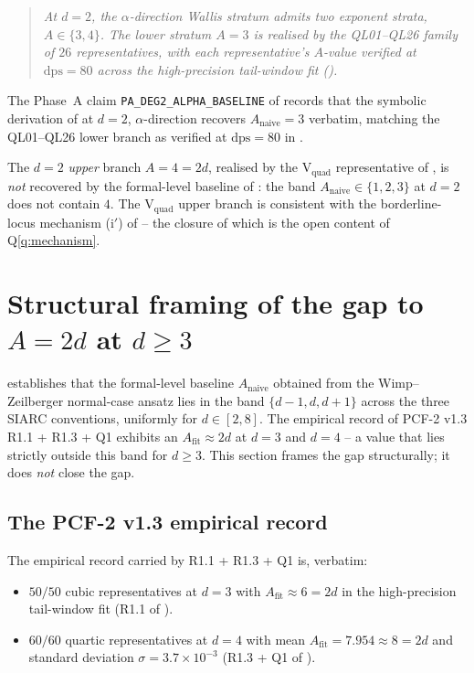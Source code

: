 \documentclass[11pt,reqno]{amsart}
\theoremstyle{plain}
\theoremstyle{definition}
\theoremstyle{remark}
\newcommand{\dps}{\mathrm{dps}}
\newcommand{\Anaive}{A_{\mathrm{naive}}}
\newcommand{\Afit}{A_{\mathrm{fit}}}
\begin{document}
\begin{quote}
\itshape
At $d = 2$, the $\alpha$-direction Wallis stratum admits two
exponent strata, $A \in \{3, 4\}$. The lower stratum $A = 3$ is
realised by the QL01--QL26 family of $26$ representatives, with
each representative's $A$-value verified at $\dps = 80$ across
the high-precision tail-window fit (\cite[\S6, Theorem~5,
lower branch]{papanokechi_pcf1_v13}).
\end{quote}

The Phase~A claim \texttt{PA\_DEG2\_ALPHA\_BASELINE} of
\cite{siarc_t1_phase2} records that the symbolic derivation
of  at $d = 2$, $\alpha$-direction
recovers $\Anaive = 3$ verbatim, matching the QL01--QL26 lower
branch as verified at $\dps = 80$ in \cite{papanokechi_pcf1_v13}.

The $d = 2$ \emph{upper} branch $A = 4 = 2d$, realised by the
V$_{\mathrm{quad}}$ representative of
\cite[\S6, Theorem~5, upper branch]{papanokechi_pcf1_v13},
is \emph{not} recovered by the formal-level baseline of
: the band $\Anaive \in \{1, 2, 3\}$ at
$d = 2$ does not contain $4$. The V$_{\mathrm{quad}}$ upper
branch is consistent with the borderline-locus mechanism
\textup{(i$'$)} of  -- the closure of
which is the open content of  Q\ref{q:mechanism}.

\section{Structural framing of the gap to $A = 2d$ at $d \ge 3$}
\label{sec:gap}

 establishes that the formal-level
baseline $\Anaive$ obtained from the Wimp--Zeilberger normal-case
ansatz lies in the band $\{d-1, d, d+1\}$ across the three SIARC
conventions, uniformly for $d \in [2, 8]$. The empirical
record of PCF-2 v1.3 R1.1 + R1.3 + Q1 \cite{papanokechi_pcf2_v13}
exhibits an $\Afit \approx 2d$ at $d = 3$ and $d = 4$ -- a value
that lies strictly outside this band for $d \ge 3$. This
section frames the gap structurally; it does \emph{not} close
the gap.

\subsection{The PCF-2 v1.3 empirical record}
\label{sec:gap-pcf2}
The empirical record carried by \cite{papanokechi_pcf2_v13}
R1.1 + R1.3 + Q1 is, verbatim:

\begin{itemize}[leftmargin=2.2em]
\item $50/50$ cubic representatives at $d=3$ with
  $\Afit \approx 6 = 2d$ in the high-precision tail-window
  fit (R1.1 of \cite{papanokechi_pcf2_v13}).
\item $60/60$ quartic representatives at $d=4$ with mean
  $\Afit = 7.954 \approx 8 = 2d$ and standard deviation
  $\sigma = 3.7 \times 10^{-3}$ (R1.3 + Q1 of
  \cite{papanokechi_pcf2_v13}).
\end{itemize}
\end{document}
